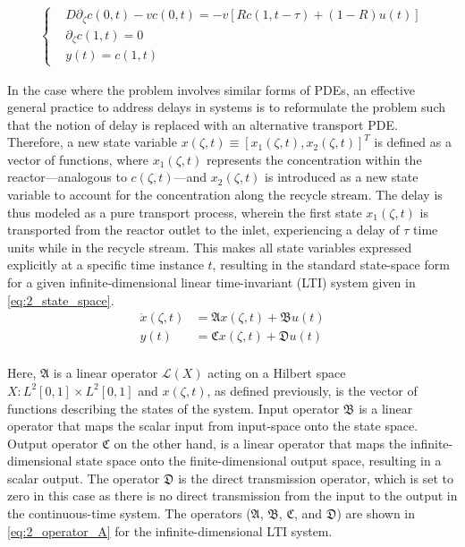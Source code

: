 \begin{align} \label{eq:2_BC}
    \begin{cases}
        &D \partial_\zeta c(0, t) - v c(0, t) = -v \left[ R c(1, t-\tau) + (1-R) u(t) \right] \\
        &\partial_\zeta c(1, t) = 0 \\
        &y(t) = c(1, t)
    \end{cases}
\end{align}

In the case where the problem involves similar forms of PDEs, an effective general practice to address delays in systems is to reformulate the problem such that the notion of delay is replaced with an alternative transport PDE. Therefore, a new state variable ${x}(\zeta, t) \equiv [x_1(\zeta, t), x_2(\zeta, t)]^T$ is defined as a vector of functions, where $x_1(\zeta, t)$ represents the concentration within the reactor—analogous to $c(\zeta,t)$—and $x_2(\zeta, t)$ is introduced as a new state variable to account for the concentration along the recycle stream. The delay is thus modeled as a pure transport process, wherein the first state $x_1(\zeta, t)$ is transported from the reactor outlet to the inlet, experiencing a delay of $\tau$ time units while in the recycle stream. This makes all state variables expressed explicitly at a specific time instance $t$, resulting in the standard state-space form for a given infinite-dimensional linear time-invariant (LTI) system given in \eqref{eq:2_state_space}.
\begin{equation} \label{eq:2_state_space}
    \begin{aligned}
        \dot{{x}}(\zeta, t) &= \mathfrak{A} {x}(\zeta, t) + \mathfrak{B} u(t) \\
        y(t) &= \mathfrak{C} {x}(\zeta, t) + \mathfrak{D} u(t) \\
    \end{aligned}
\end{equation}

Here, $\mathfrak{A}$ is a linear operator $\mathcal{L}(X)$ acting on a Hilbert space $X: L^2[0,1] \times L^2[0,1]$ and ${x}(\zeta,t)$, as defined previously, is the vector of functions describing the states of the system. Input operator $\mathfrak{B}$ is a linear operator that maps the scalar input from input-space onto the state space. Output operator $\mathfrak{C}$ on the other hand, is a linear operator that maps the infinite-dimensional state space onto the finite-dimensional output space, resulting in a scalar output. The operator $\mathfrak{D}$ is the direct transmission operator, which is set to zero in this case as there is no direct transmission from the input to the output in the continuous-time system. The operators ($\mathfrak{A}$, $\mathfrak{B}$, $\mathfrak{C}$, and $\mathfrak{D}$) are shown in \eqref{eq:2_operator_A} for the infinite-dimensional LTI system.

